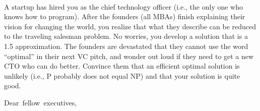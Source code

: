 \documentclass[12pt]{article}
\begin{document}
\renewcommand{\headrulewidth}{0.5pt}

\phantom{Test}
\\ A startup has hired you as the chief technology officer (i.e., the only one who
knows how to program). After the founders (all MBAs) finish explaining their
vision for changing the world, you realize that what they describe can be
reduced to the traveling salesman problem. No worries, you develop a solution
that is a 1.5 approximation. The founders are devastated that they cannot use
the word ``optimal'' in their next VC pitch, and wonder out loud if they need
to get a new CTO who can do better. Convince them that an efficient optimal
solution is unlikely (i.e., P probably does not equal NP) and that your
solution is quite good.
\pagebreak

\newpage
\mbox{Dear fellow executives,}
\end{document}
